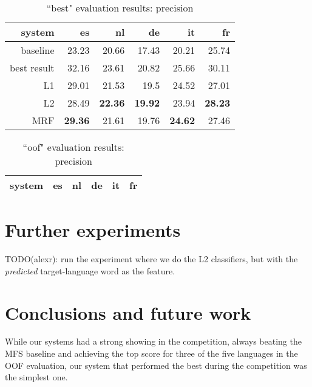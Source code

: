 \documentclass[11pt,letterpaper]{article}
\begin{document}
\begin{table*}[t!]
  \begin{center}
    \begin{tabular}{|r|r|r|r|r|r|}
      \hline
      system   & es    & nl    & de    &  it   & fr \\
      \hline
      baseline & 23.23          & 20.66          & 17.43          & 20.21          & 25.74 \\
   best result & 32.16          & 23.61          & 20.82          & 25.66          & 30.11 \\
            L1 & 29.01          & 21.53          & 19.5           & 24.52          & 27.01 \\
            L2 & 28.49          & \textbf{22.36} & \textbf{19.92} & 23.94          & \textbf{28.23} \\
           MRF & \textbf{29.36} & 21.61          & 19.76          & \textbf{24.62} & 27.46 \\
      \hline
    \end{tabular}
  \caption{``best" evaluation results: precision}
  \label{table:resultsbest}
  \end{center}
\end{table*}


\begin{table*}[t!]
  \begin{center}
    \begin{tabular}{|r|r|r|r|r|r|}
      \hline
      system   & es    & nl    & de    &  it   & fr \\
      \hline
      \hline
    \end{tabular}
  \caption{``oof" evaluation results: precision}
  \label{table:resultsbest}
  \end{center}
\end{table*}


\section{Further experiments}
TODO(alexr): run the experiment where we do the L2 classifiers, but with the
\emph{predicted} target-language word as the feature.

\section{Conclusions and future work}
While our systems had a strong showing in the competition, always beating the
MFS baseline and achieving the top score for three of the five languages in the
OOF evaluation, our system that performed the best during the competition was
the simplest one.
\end{document}
